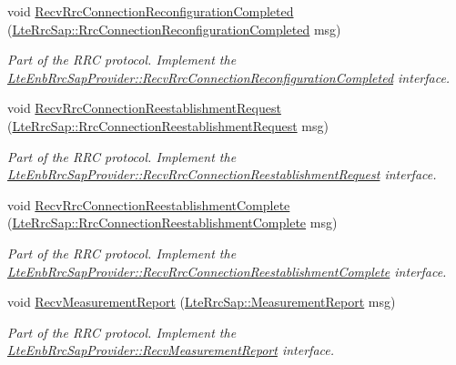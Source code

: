 \begin{DoxyCompactItemize}
void \hyperlink{classns3_1_1UeManager_a767171084a3ea38162758d145b705e2a}{Recv\+Rrc\+Connection\+Reconfiguration\+Completed} (\hyperlink{structns3_1_1LteRrcSap_1_1RrcConnectionReconfigurationCompleted}{Lte\+Rrc\+Sap\+::\+Rrc\+Connection\+Reconfiguration\+Completed} msg)
\begin{DoxyCompactList}\small\item\em Part of the R\+RC protocol. Implement the \hyperlink{classns3_1_1LteEnbRrcSapProvider_a551d1002a06181295debe624dfd1322b}{Lte\+Enb\+Rrc\+Sap\+Provider\+::\+Recv\+Rrc\+Connection\+Reconfiguration\+Completed} interface. \end{DoxyCompactList}\item 
void \hyperlink{classns3_1_1UeManager_a02513c99e18c815fc58a05e4b135ecfa}{Recv\+Rrc\+Connection\+Reestablishment\+Request} (\hyperlink{structns3_1_1LteRrcSap_1_1RrcConnectionReestablishmentRequest}{Lte\+Rrc\+Sap\+::\+Rrc\+Connection\+Reestablishment\+Request} msg)
\begin{DoxyCompactList}\small\item\em Part of the R\+RC protocol. Implement the \hyperlink{classns3_1_1LteEnbRrcSapProvider_a205d3d264d52fa434896589d48d8210e}{Lte\+Enb\+Rrc\+Sap\+Provider\+::\+Recv\+Rrc\+Connection\+Reestablishment\+Request} interface. \end{DoxyCompactList}\item 
void \hyperlink{classns3_1_1UeManager_ac37bbe0bc63e4fd32c098df8c2f531b8}{Recv\+Rrc\+Connection\+Reestablishment\+Complete} (\hyperlink{structns3_1_1LteRrcSap_1_1RrcConnectionReestablishmentComplete}{Lte\+Rrc\+Sap\+::\+Rrc\+Connection\+Reestablishment\+Complete} msg)
\begin{DoxyCompactList}\small\item\em Part of the R\+RC protocol. Implement the \hyperlink{classns3_1_1LteEnbRrcSapProvider_a45f6b371cbc613840cdc2c950768201f}{Lte\+Enb\+Rrc\+Sap\+Provider\+::\+Recv\+Rrc\+Connection\+Reestablishment\+Complete} interface. \end{DoxyCompactList}\item 
void \hyperlink{classns3_1_1UeManager_aaf0bb6b60d798db37cefb97f4b1884e6}{Recv\+Measurement\+Report} (\hyperlink{structns3_1_1LteRrcSap_1_1MeasurementReport}{Lte\+Rrc\+Sap\+::\+Measurement\+Report} msg)
\begin{DoxyCompactList}\small\item\em Part of the R\+RC protocol. Implement the \hyperlink{classns3_1_1LteEnbRrcSapProvider_abf788b7395d6a2bc7e0ab86a3f992695}{Lte\+Enb\+Rrc\+Sap\+Provider\+::\+Recv\+Measurement\+Report} interface. \end{DoxyCompactList}\item 

\end{DoxyCompactItemize}
